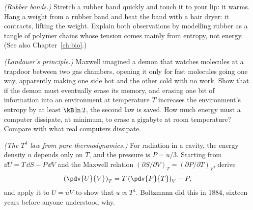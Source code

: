 \begin{problems}
 \emph{(Rubber bands.)} Stretch a rubber band quickly and touch it to your lip: it warms. Hang a weight from a rubber band and heat the band with a hair dryer: it contracts, lifting the weight. Explain both observations by modelling rubber as a tangle of polymer chains whose tension comes mainly from entropy, not energy. (See also Chapter~\ref{ch:bio}.)

\core \label{prob:landauer} \emph{(Landauer's principle.)} Maxwell imagined a demon that watches molecules at a trapdoor between two gas chambers, opening it only for fast molecules going one way, apparently making one side hot and the other cold with no work. Show that if the demon must eventually erase its memory, and erasing one bit of information into an environment at temperature $T$ increases the environment's entropy by at least $\kB\ln2$, the second law is saved. How much energy must a computer dissipate, at minimum, to erase a gigabyte at room temperature? Compare with what real computers dissipate.

\core \label{prob:stefan-boltzmann} \emph{(The $T^4$ law from pure thermodynamics.)} For radiation in a cavity, the energy density $u$ depends only on $T$, and the pressure is $P = u/3$. Starting from $\dd U = T\,\dd S - P\,\dd V$ and the Maxwell relation $(\partial S/\partial V)_T = (\partial P/\partial T)_V$, derive
\[
  \left(\pdv{U}{V}\right)_T = T\left(\pdv{P}{T}\right)_V - P,
\]
and apply it to $U = uV$ to show that $u\propto T^4$. Boltzmann did this in 1884, sixteen years before anyone understood why.
\end{problems}

\begin{reading}
\end{reading}
